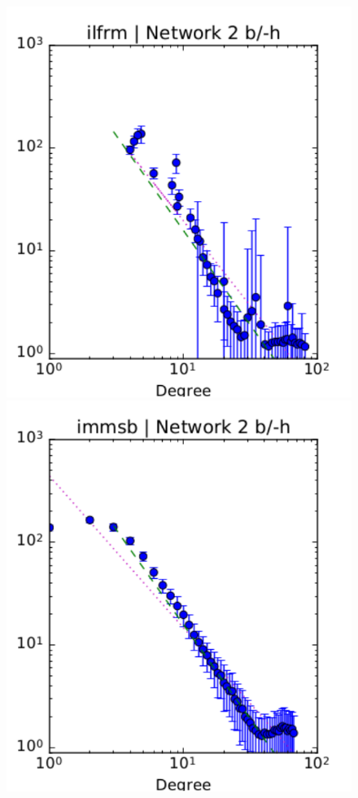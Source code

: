 \begin{figure}[h]
	\endminipage
	\vspace{-0.4cm}
	\includegraphics[scale=0.4]{img/ilfrm_g2_d}
	\endminipage
	\includegraphics[scale=0.4]{img/immsb_g2_d}

\end{figure}
